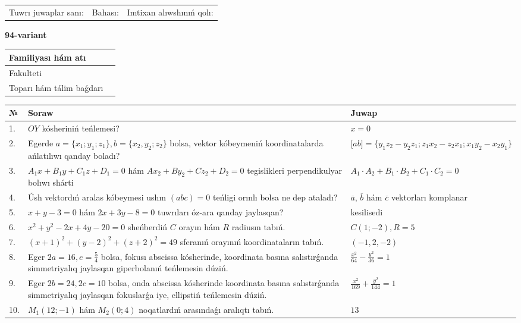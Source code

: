 \documentclass{article}
\begin{document}
\vspace{1cm}

\begin{tabular}{lll}
Tuwrı juwaplar sanı: \underline{\hspace{1.5cm}} & 
Bahası: \underline{\hspace{1.5cm}} & 
Imtixan alıwshınıń qolı: \underline{\hspace{2cm}} \\
\end{tabular}

\egroup

\newpage


\textbf{94-variant}\\

\bgroup
\def\arraystretch{1.6} %

\begin{tabular}{|m{5.7cm}|m{9.5cm}|}
\hline
Familiyası hám atı & \\
\hline
Fakulteti  & \\
\hline
Toparı hám tálim baǵdarı  & \\
\hline
\end{tabular}

\vspace{1cm}

\begin{tabular}{|m{0.7cm}|m{10cm}|m{4cm}|}
\hline
№ & Soraw & Juwap \\
\hline
1. & $OY$ kósheriniń teńlemesi? & $x=0$ \\
\hline
2. & Egerde $a=\{ x_1; y_1; z_1\}, b=\{ x_2, y_2; z_2\}$ bolsa, vektor kóbeymeniń koordinatalarda ańlatılıwı qanday boladı? &  $\lbrack ab\rbrack=\{y_1z_2-y_2z_1; z_1x_2-z_2x_1; x_1y_2-x_2y_1\}$ \\
\hline
3. & $A_1x+B_1y+C_1z+D_1=0$ hám $Ax_2+By_2+Cz_2+D_2=0$ tegislikleri perpendikulyar bolıwı shárti & $A_1\cdot A_2+B_1\cdot B_2+C_1\cdot C_2=0$ \\
\hline
4. & Úsh vektordıń aralas kóbeymesi ushın $(abc)=0$ teńligi orınlı bolsa ne dep ataladı? & $\overline{a}$, $\overline{b}$ hám $\overline{c}$ vektorları komplanar \\
\hline
5. & $x+y-3=0$ hám $2x+3y-8=0$ tuwrıları óz-ara qanday jaylasqan? & kesilisedi \\
\hline
6. & $x^{2}+y^{2}-2x+4y-20=0$ sheńberdiń $C$ orayın hám $R$ radiusın tabıń. & $C(1;-2), R=5$ \\
\hline
7. & $(x+1)^{2}+(y-2) ^{2}+(z+2) ^{2}=49$ sferanıń orayınıń koordinataların tabıń. & $(-1,2,-2)$ \\
\hline
8. & Eger $2a=16, e=\frac{5}{4}$ bolsa, fokusı abscissa kósherinde, koordinata basına salıstırǵanda simmetriyalıq jaylasqan giperbolanıń teńlemesin dúziń. & $\frac{x^{2}}{64}-\frac{y^{2}}{36}=1$ \\
\hline
9. & Eger $2b=24, 2 c=10$ bolsa, onda abscissa kósherinde koordinata basına salıstırǵanda simmetriyalıq jaylasqan fokuslarǵa iye, ellipstiń teńlemesin dúziń. & $\frac{x^{2}}{169}+\frac{y^{2}}{144}=1$ \\
\hline
10. & $M_{1} (12;-1)$ hám $M_{2} (0;4)$ noqatlardıń arasındaǵı aralıqtı tabıń. & $13$ \\
\hline
\end{tabular}
\end{document}
